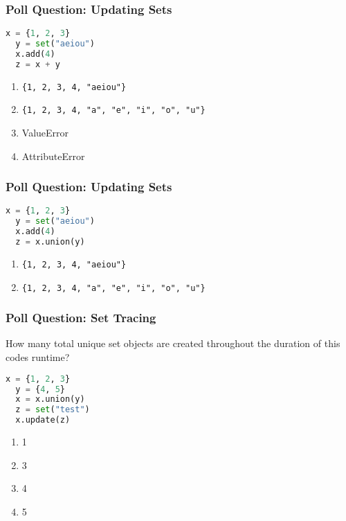 \documentclass[xcolor=table]{beamer}
\begin{document}
%
%
\begin{frame}[fragile]
  \frametitle{Poll Question: Updating Sets}
  \begin{lstlisting}[language=Python, autogobble]
  x = {1, 2, 3}
  y = set("aeiou")
  x.add(4)
  z = x + y
  \end{lstlisting}
  \vfill
  \begin{enumerate}[A] 
    \item \lstinline|{1, 2, 3, 4, "aeiou"}|
    \item \lstinline|{1, 2, 3, 4, "a", "e", "i", "o", "u"}|
    \item ValueError
    \item AttributeError
  \end{enumerate}
\end{frame}

%
%
\begin{frame}[fragile]
  \frametitle{Poll Question: Updating Sets}
  \begin{lstlisting}[language=Python, autogobble]
  x = {1, 2, 3}
  y = set("aeiou")
  x.add(4)
  z = x.union(y)
  \end{lstlisting}
  \vfill
  \begin{enumerate}[A] 
    \item \lstinline|{1, 2, 3, 4, "aeiou"}|
    \item \lstinline|{1, 2, 3, 4, "a", "e", "i", "o", "u"}|
  \end{enumerate}
\end{frame}

%
%
\begin{frame}[fragile]
  \frametitle{Poll Question: Set Tracing}
  How many total unique set objects are created throughout the duration of this
  codes runtime?
  \begin{lstlisting}[language=Python, autogobble]
  x = {1, 2, 3}
  y = {4, 5}
  x = x.union(y)
  z = set("test")
  x.update(z)
  \end{lstlisting}
  \vfill
  \begin{enumerate}[A] 
    \item 1
    \item 3
    \item 4
    \item 5
  \end{enumerate}
\end{frame}
\end{document}
